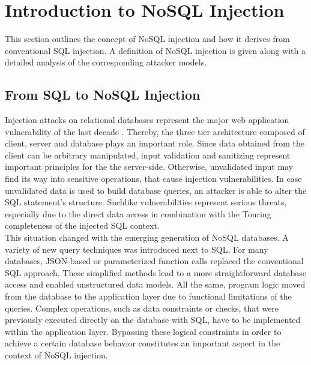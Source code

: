 \chapter{Introduction to NoSQL Injection}
\label{cha:intro_to_nosql_injection}
This section outlines the concept of NoSQL injection and how it derives from conventional SQL injection. A definition of NoSQL injection is given along with a detailed analysis of the corresponding attacker models.

\section{From SQL to NoSQL Injection}
\label{sec:fromSQLtoNoSQLinjection}
Injection attacks on relational databases represent the major web application vulnerability of the last decade \cite{OWASP:2013b}. Thereby, the three tier architecture composed of client, server and database plays an important role. Since data obtained from the client can be arbitrary manipulated, input validation and sanitizing represent important principles for the the server-side. Otherwise, unvalidated input may find its way into sensitive operations, that cause injection vulnerabilities. In case unvalidated data is used to build database queries, an attacker is able to alter the SQL statement's structure. Suchlike vulnerabilities represent serious threats, especially due to the direct data access in combination with the Touring completeness of the injected SQL context.\\ 

This situation changed with the emerging generation of NoSQL databases. A variety of new query techniques was introduced next to SQL. For many databases, JSON-based or parameterized function calls replaced the conventional SQL approach. These simplified methods lead to a more straightforward database access and enabled unstructured data models. All the same, program logic moved from the database to the application layer due to functional limitations of the queries. Complex operations, such as data constraints or checks, that were previously executed directly on the database with SQL, have to be implemented within the application layer. Bypassing these logical constraints in order to achieve a certain database behavior constitutes an important aspect in the context of NoSQL injection. \\ 

